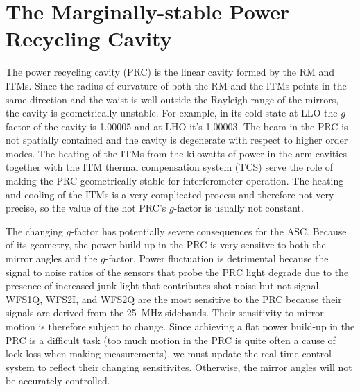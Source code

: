 \section{The Marginally-stable Power Recycling Cavity}
The power recycling cavity (PRC) is the linear cavity formed by the RM
and ITMs. Since the radius of curvature of both the RM and the ITMs
points in the same direction and the waist is well outside the
Rayleigh range of the mirrors, the cavity is geometrically
unstable. For example, in its cold state at LLO the $g$-factor of the
cavity is 1.00005 and at LHO it's 1.00003. The beam in the PRC is not
spatially contained and the cavity is degenerate with respect to
higher order modes. The heating of the ITMs from the kilowatts of
power in the arm cavities together with the ITM thermal compensation
system (TCS) serve the role of making the PRC geometrically stable for
interferometer operation. The heating and cooling of the ITMs is a
very complicated process and therefore not very precise, so the value
of the hot PRC's $g$-factor is usually not constant.

The changing $g$-factor has potentially severe consequences
for the ASC. Because of its geometry, the power build-up in the PRC is
very sensitve to both the mirror angles and the $g$-factor. Power
fluctuation is detrimental because the signal to noise ratios of the
sensors that probe the PRC light degrade due to the presence of
increased junk light that contributes shot noise but not
signal. WFS1Q, WFS2I, and WFS2Q are the most sensitive to the PRC
because their signals are derived from the 25~MHz sidebands. Their
sensitivity to mirror motion is therefore subject to change. Since
achieving a flat power build-up in the PRC is a difficult task (too
much motion in the PRC is quite often a cause of lock loss when making
measurements), we must update the real-time control system to reflect
their changing sensitivites. Otherwise, the mirror angles will not be
accurately controlled.

